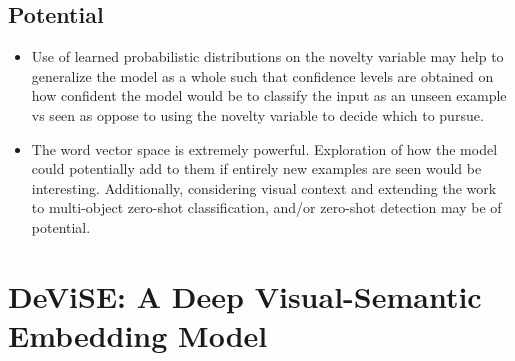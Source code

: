 \documentclass{article}
\begin{document}
\subsection{Potential}
\begin{itemize}
    \item Use of learned probabilistic distributions on the novelty variable may help to generalize the model as a whole such that confidence levels are obtained on how confident the model would be to classify the input as an unseen example vs seen as oppose to using the novelty variable to decide which to pursue.
    \item The word vector space is extremely powerful. Exploration of how the model could potentially add to them if entirely new examples are seen would be interesting. Additionally, considering visual context and extending the work to multi-object zero-shot classification, and/or zero-shot detection may be of potential.
\end{itemize}
    
\section{DeViSE: A Deep Visual-Semantic Embedding Model \cite{Frome-NIPS2013_5204}}
\end{document}
